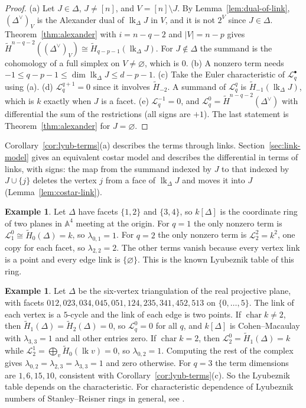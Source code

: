 \documentclass[11pt]{article}
\theoremstyle{plain}
\theoremstyle{definition}
\newtheorem{example}[theorem]{Example}
\newcommand{\kk}{k}
\newcommand{\link}{\operatorname{lk}}
\newcommand{\rH}{\widetilde{H}}
\newcommand{\Lc}{\mathcal L}
\begin{document}
\begin{proof}
(a) Let $J\in\Delta$, $J\ne[n]$, and $V=[n]\setminus J$. By Lemma~\ref{lem:dual-of-link}, $(\Delta^\vee)_V$ is the
Alexander dual of $\link_\Delta J$ in $V$, and it is not $2^V$ since $J\in\Delta$. Theorem~\ref{thm:alexander} with
$i=n-q-2$ and $|V|=n-p$ gives $\rH^{n-q-2}((\Delta^\vee)_V)\cong\rH_{q-p-1}(\link_\Delta J)$. For $J\notin\Delta$ the
summand is the cohomology of a full simplex on $V\ne\varnothing$, which is $0$.
(b) A nonzero term needs $-1\le q-p-1\le\dim\link_\Delta J\le d-p-1$.
(c) Take the Euler characteristic of $\Lc^\bullet_q$ using (a).
(d) $\Lc^{q+1}_q=0$ since it involves $\rH_{-2}$. A summand of $\Lc^q_q$ is $\rH_{-1}(\link_\Delta J)$, which is $\kk$
exactly when $J$ is a facet.
(e) $\Lc^{-1}_q=0$, and $\Lc^0_q=\rH^{n-q-2}(\Delta^\vee)$ with differential the sum of the restrictions (all signs
are $+1$). The last statement is Theorem~\ref{thm:alexander} for $J=\varnothing$.
\end{proof}

Corollary~\ref{cor:lyub-terms}(a) describes the terms through links. Section~\ref{sec:link-model} gives an
equivalent costar model and describes the differential in terms of links, with signs: the map from the
summand indexed by $J$ to that indexed by $J\cup\{j\}$ deletes the vertex $j$ from a face of
$\link_\Delta J$ and moves it into $J$ (Lemma~\ref{lem:costar-link}).

\begin{example}\label{ex:two-planes}
Let $\Delta$ have facets $\{1,2\}$ and $\{3,4\}$, so $\kk[\Delta]$ is the coordinate ring of two planes in
$\mathbb A^4$ meeting at the origin. For $q=1$ the only nonzero term is $\Lc^0_1\cong\rH_0(\Delta)=\kk$, so
$\lambda_{0,1}=1$. For $q=2$ the only nonzero term is $\Lc^2_2=\kk^2$, one copy for each facet, so
$\lambda_{2,2}=2$. The other terms vanish because every vertex link is a point and every edge link is
$\{\varnothing\}$. This is the known Lyubeznik table of this ring.
\end{example}

\begin{example}\label{ex:rp2}
Let $\Delta$ be the six-vertex triangulation of the real projective plane, with facets
$012,023,034,045,051,124,235,341,452,513$ on $\{0,\dots,5\}$. The link of each vertex is a $5$-cycle and the link of
each edge is two points. If $\operatorname{char}\kk\ne2$, then $\rH_1(\Delta)=\rH_2(\Delta)=0$, so $\Lc^0_q=0$ for all
$q$, and $\kk[\Delta]$ is Cohen--Macaulay with $\lambda_{3,3}=1$ and all other entries zero. If $\operatorname{char}\kk=2$,
then $\Lc^0_2=\rH_1(\Delta)=\kk$ while $\Lc^1_2=\bigoplus_v\rH_0(\link v)=0$, so $\lambda_{0,2}=1$. Computing the
rest of the complex gives $\lambda_{0,2}=\lambda_{2,3}=\lambda_{3,3}=1$ and zero otherwise. For $q=3$ the term
dimensions are $1,6,15,10$, consistent with Corollary~\ref{cor:lyub-terms}(c). So the Lyubeznik table depends on the
characteristic. For characteristic dependence of Lyubeznik numbers of Stanley--Reisner rings in general, see
\cite{AlvarezMontanerVahidi}.
\end{example}
\end{document}
